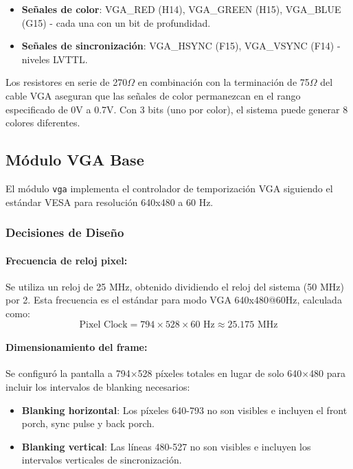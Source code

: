 \documentclass[a4paper, 12pt]{report}
\begin{document}
\begin{itemize}
    \item \textbf{Señales de color}: VGA\_RED (H14), VGA\_GREEN (H15), VGA\_BLUE (G15) - cada una con un bit de profundidad.
    \item \textbf{Señales de sincronización}: VGA\_HSYNC (F15), VGA\_VSYNC (F14) - niveles LVTTL.
\end{itemize}

Los resistores en serie de 270$\Omega$ en combinación con la terminación de 75$\Omega$ del cable VGA aseguran que las señales de color permanezcan en el rango especificado de 0V a 0.7V. Con 3 bits (uno por color), el sistema puede generar 8 colores diferentes.

\subsection{Módulo VGA Base}

El módulo \texttt{vga} implementa el controlador de temporización VGA siguiendo el estándar VESA para resolución 640x480 a 60 Hz.

\subsubsection{Decisiones de Diseño}

\paragraph{Frecuencia de reloj pixel:} Se utiliza un reloj de 25 MHz, obtenido dividiendo el reloj del sistema (50 MHz) por 2. Esta frecuencia es el estándar para modo VGA 640x480@60Hz, calculada como:
$$\text{Pixel Clock} = 794 \times 528 \times 60 \text{ Hz} \approx 25.175 \text{ MHz}$$

\paragraph{Dimensionamiento del frame:} Se configuró la pantalla a 794$\times$528 píxeles totales en lugar de solo 640$\times$480 para incluir los intervalos de blanking necesarios:

\begin{itemize}
    \item \textbf{Blanking horizontal}: Los píxeles 640-793 no son visibles e incluyen el front porch, sync pulse y back porch.
    \item \textbf{Blanking vertical}: Las líneas 480-527 no son visibles e incluyen los intervalos verticales de sincronización.
\end{itemize}
\end{document}

